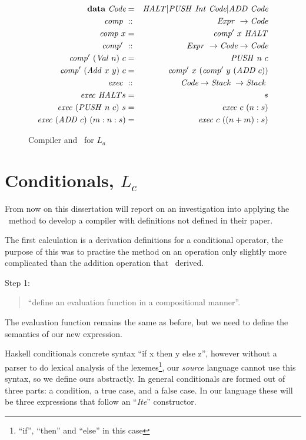 \documentclass {article}
\begin{document}
\begin{figure}[h]
\centering 
\begin{eqnarray*}
	\textbf{data}\  \textit{Code} &=& \mathit{HALT} |
			 \mathit{PUSH\ } \mathit{Int\ } \textit{Code} | \mathit{ADD\ } \textit{Code}  \\
	\mathit{comp\ } &::& \mathit{Expr\ } \rightarrow \textit{Code} \\
	\mathit{comp\ } x &=& \mathit{comp'\ }  x\ \mathit{HALT} \\
	\mathit{comp'\ } &::& \mathit{Expr\ } \rightarrow \textit{Code} \rightarrow \textit{Code}  \\
	\mathit{comp'\ }  (\mathit{Val\ } n)\ c &=& \mathit{PUSH\ } n\ c \\
	\mathit{comp'\ }  (\mathit{Add\ } x\ y)\ c 
				&=& \mathit{comp'\ }  x\ (\mathit{comp'\ }  y\ (\mathit{ADD\ } c))\\
	\mathit{exec\ } &::& \textit{Code}  \rightarrow \textit{Stack\ } \rightarrow \textit{Stack\ }  \\
	\mathit{exec\ } \mathit{HALT} s &=& s  \\
	\mathit{exec\ } (\mathit{PUSH\ } n\ c)\ s &=& \mathit{exec\ } c\ (n:s) \\
	\mathit{exec\ } (\mathit{ADD\ } c)\ (m:n:s) &=& \mathit{exec\ } c\ ((n + m):s)  \\
\end{eqnarray*}
\caption{Compiler and \vm\ for $L_a$}
\end{figure}



\pagebreak
\section{Conditionals, $L_c$} \label{langcond}

From now on this dissertation will report on an
investigation into applying the \BH\ method to develop a compiler
with definitions not defined in their paper\cite{bandh}.

The first calculation is a derivation
definitions for a conditional operator,
the purpose of this was to practise the method
on an operation only slightly more complicated than
the addition operation that \BH\ derived.

\newcommand{\ite}{\textit{Ite}}
\newcommand{\Ite}{\mathit{Ite\ }}
\newcommand{\String}{\mathit{String\ }}

Step 1: 
\begin{quote}
``define an evaluation function in a compositional manner''.
\end{quote}
The evaluation function remains 
the same as before,
but we need to define 
the semantics of our new expression.

Haskell conditionals concrete
syntax ``if  x then y else z'',
however without a parser to do
lexical analysis\cite[chapter 2.2]{dragon} of the lexemes\footnote{
``if'', ``then'' and ``else'' in this case},
our \emph{source} language cannot use this
syntax, so we define ours abstractly.
In general conditionals are formed out of three parts:
a condition, a true case, and a false case.
In our language these will be three expressions
that follow an ``\ite'' constructor.
\end{document}
